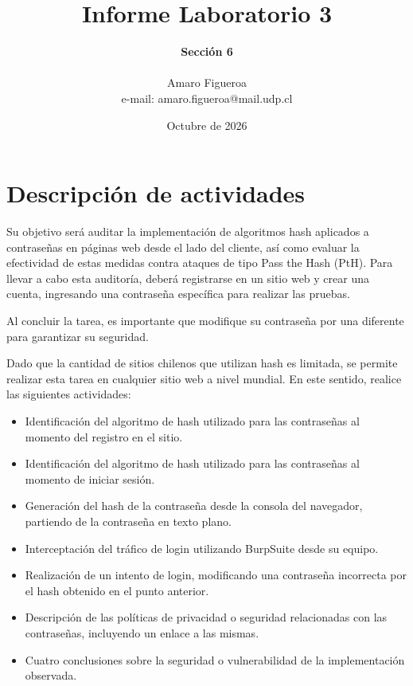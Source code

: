 \documentclass[letter,12pt]{article}
\begin{document}
%
   \title{\Huge{Informe Laboratorio 3}}

   \author{\textbf{Sección 6} \\  \\Amaro Figueroa \\ e-mail: amaro.figueroa@mail.udp.cl}

   \date{Octubre de 2026}

   \maketitle

   \tableofcontents

  \newpage


\section{Descripción de actividades}
Su objetivo será auditar la implementación de algoritmos hash aplicados a contraseñas en páginas web desde el lado del cliente, así como evaluar la efectividad de estas medidas contra ataques de tipo Pass the Hash (PtH). Para llevar a cabo esta auditoría, deberá registrarse en un sitio web y crear una cuenta, ingresando una contraseña específica para realizar las pruebas.\par

Al concluir la tarea, es importante que modifique su contraseña por una diferente para garantizar su seguridad.\par

Dado que la cantidad de sitios chilenos que utilizan hash es limitada, se permite realizar esta tarea en cualquier sitio web a nivel mundial. En este sentido, realice las siguientes actividades:


\begin{itemize}
    \item Identificación del algoritmo de hash utilizado para las contraseñas al momento del registro en el sitio.

    \item Identificación del algoritmo de hash utilizado para las contraseñas al momento de iniciar sesión.

    \item Generación del hash de la contraseña desde la consola del navegador, partiendo de la contraseña en texto plano.

    \item Interceptación del tráfico de login utilizando BurpSuite desde su equipo.

    \item Realización de un intento de login, modificando una contraseña incorrecta por el hash obtenido en el punto anterior.

    \item Descripción de las políticas de privacidad o seguridad relacionadas con las contraseñas, incluyendo un enlace a las mismas.

    \item Cuatro conclusiones sobre la seguridad o vulnerabilidad de la implementación observada.




\end{itemize}
\end{document}
